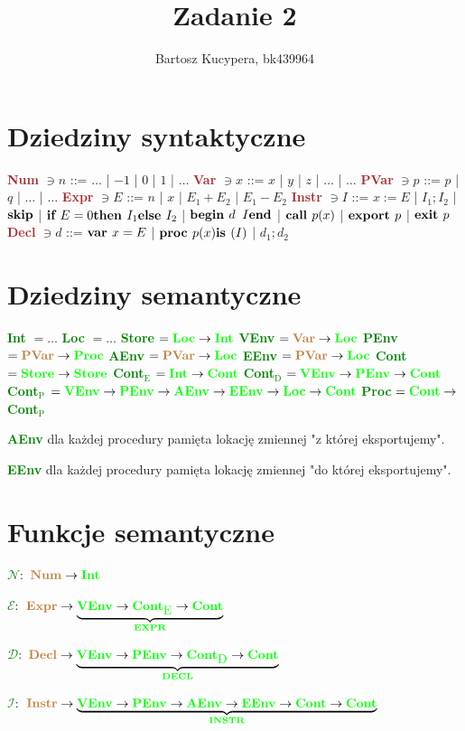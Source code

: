 \documentclass{article}
\title{Zadanie 2}
\author{Bartosz Kucypera, bk439964}
\date{}
\newcommand{\br}[1]{\textcolor{brown}{\textbf{#1}}}
\newcommand{\gr}[1]{\textcolor{green}{\textbf{#1}}}
\newcommand{\grr}[2]{\textcolor{green}{\textbf{#1}\(_{\mbox{#2}}\)}}
\newcommand{\grrm}[2]{\textcolor{green}{\textbf{#1}_{\mbox{#2}}}}
\newcommand{\n}{\newline}
\newcommand{\bd}[1]{\mbox{\bf#1}}
\newcommand{\lc}[1]{\textcolor{green}{$\mathcal{#1}$}}
\begin{document}
\maketitle

\section*{Dziedziny syntaktyczne}
\br{Num} $\ni n$ ::=  $\dots$ | $-1$ | $0$ | $1$ | $\dots$ \n
\br{Var} $\ni x$ ::= $x$ | $y$ | $z$ | $\dots$ | $\dots$ \n
\br{PVar} $\ni p$ ::= $p$ | $q$ | $\dots$ | $\dots$ \n
\br{Expr} $\ni E$ ::= $n$ | $x$ | $E_1 + E_2$ | $E_1 - E_2$ \n
\br{Instr} $\ni I$ ::= $x:=E$ | $I_1;I_2$ | $\bd{skip}$ | $\bd{if } E =  0 \bd{ then } I_1 \bd{ else } I_2$ | $\bd{begin } d \;\; I \bd{ end}$ | \n
\hspace*{5.5em} $\bd{ call } p(x)$ | $\bd{export } p$ | $\bd{exit } p$ \n
\br{Decl} $\ni d$ ::= $\bd{var } x = E$ | $\bd{proc } p(x) \bd{ is } (I)$ | $d_1;d_2$

\section*{Dziedziny semantyczne}
\gr{Int} $= \dots$ \n
\gr{Loc} $= \dots$ \n
\gr{Store} $= \gr{Loc} \to \gr{Int}$ \n
\gr{VEnv} $= \br{Var} \to \gr{Loc}$ \n
\gr{PEnv} $= \br{PVar} \to \gr{Proc}$ \n
\gr{AEnv} $= \br{PVar} \to \gr{Loc}$ \n
\gr{EEnv} $= \br{PVar} \to \gr{Loc}$ \n
\gr{Cont} $= \gr{Store} \to \gr{Store}$ \n
\grr{Cont}{E} $= \gr{Int} \to \gr{Cont}$ \n
\grr{Cont}{D} $= \gr{VEnv} \to \gr{PEnv} \to \gr{Cont}$ \n
\grr{Cont}{P} $= \gr{VEnv} \to \gr{PEnv} \to \gr{AEnv} \to \gr{EEnv} \to \gr{Loc} \to \gr{Cont}$ \n
\gr{Proc} $= \gr{Cont} \to$ \grr{Cont}{P}\n

\gr{AEnv} dla każdej procedury pamięta lokację zmiennej "z której eksportujemy".

\gr{EEnv} dla każdej procedury pamięta lokację zmiennej "do której eksportujemy".

\section*{Funkcje semantyczne}
\lc{N}$:$ $\br{Num} \to \gr{Int}$ 

\lc{E}$:$ $\br{Expr} \to \underbrace{\gr{VEnv} \to \grrm{Cont}{E} \to \gr{Cont}}_{\gr{EXPR}}$

\lc{D}$:$ $\br{Decl} \to \underbrace{\gr{VEnv} \to \gr{PEnv} \to \grrm{Cont}{D} \to \gr{Cont}}_{\gr{DECL}}$

\lc{I}$:$ $\br{Instr} \to \underbrace{\gr{VEnv} \to \gr{PEnv} \to \gr{AEnv} \to \gr{EEnv} \to \gr{Cont} \to \gr{Cont}}_{\gr{INSTR}}$
\end{document}
